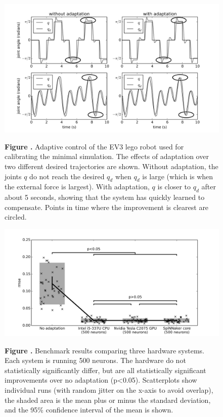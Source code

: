 \documentclass{frontiersSCNS} %
\begin{document}
\begin{figure}[h!]
\begin{center}
\includegraphics[width=18cm]{figures/fig_ev3}
\end{center}
 \textbf{\label{fig:ev3} Figure .}{ Adaptive control of the EV3 lego robot used for calibrating the minimal simulation.
 The effects of adaptation over two different desired trajectories are shown.  Without adaptation, the joints $q$ do not reach the desired $q_d$ when $q_d$ is large (which
 is when the external force is largest).  With adaptation, $q$ is closer to $q_d$ after about 5 seconds, showing that the system has quickly learned to compensate.
 Points in time where the improvement is clearest are circled.}
\end{figure}

\begin{figure}[h!]
\begin{center}
\includegraphics[width=18cm]{figures/plot_basic}
\end{center}
 \textbf{\label{fig:analysis_basic} Figure .}{ Benchmark results comparing three hardware systems.
     Each system is running 500 neurons.  The hardware do not statistically
     significantly differ, but are all statistically significant improvements 
     over no adaptation (p<0.05).
     Scatterplots show individual runs (with random jitter on the x-axis
     to avoid overlap), the 
     shaded area is the mean plus or minus the standard deviation, and the 95\% confidence interval of the mean is shown.}
\end{figure}
\end{document}
